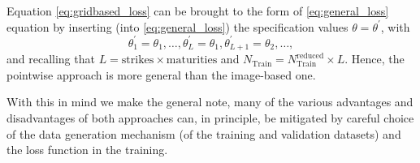 \documentclass{article}
\theoremstyle{remark}
\begin{document}
Equation \eqref{eq:gridbased_loss} can be brought to the form of
\eqref{eq:general_loss} equation by inserting (into \eqref{eq:general_loss})
the specification values $\theta = \theta^\prime$, with
$$
\theta^\prime_1 = \theta_1, \ldots, \theta^\prime_L = \theta_1,
\theta^\prime_{L+1} = \theta_2, \ldots,
$$
and recalling that
$L=\textrm{strikes}\times \textrm{maturities}$ and
$N_{\mathrm{Train}}=N_{\mathrm{Train}}^{\mathrm{reduced}} \times L$. Hence,
the pointwise approach is more general than the image-based one.


With this in mind we make the general note, many of the various advantages and disadvantages of both
approaches can, in principle, be mitigated by careful choice of the data
generation mechanism (of the training and validation datasets) and the loss
function in the training.
\end{document}
